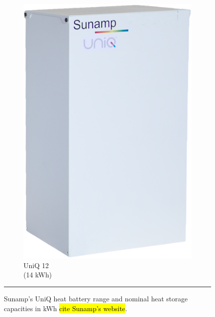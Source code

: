 \begin{figure}[htbp]
\begin{subfigure}{.24\textwidth}
	\includegraphics[width=\textwidth]{figures/sunamp-uniq-12.png}
	\caption{UniQ 12\\
		(14 kWh)}
	\label{fig:uniq12}
	\end{subfigure}
	\rule{\textwidth}{0.5pt} %
	\caption{Sunamp's UniQ heat battery range and nominal heat storage capacities in kWh \hl{cite Sunamp's website}.
	}
	\label{fig:uniq_range}
\end{figure}


